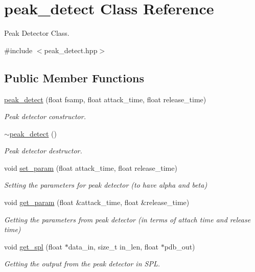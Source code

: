 \hypertarget{classpeak__detect}{}\section{peak\+\_\+detect Class Reference}
\label{classpeak__detect}


Peak Detector Class.  




{\ttfamily \#include $<$peak\+\_\+detect.\+hpp$>$}

\subsection*{Public Member Functions}
\begin{DoxyCompactItemize}
\item 
\hyperlink{classpeak__detect_a03414e20d9aa0ffce0196ac21ec61ec6}{peak\+\_\+detect} (float fsamp, float attack\+\_\+time, float release\+\_\+time)
\begin{DoxyCompactList}\small\item\em Peak detector constructor. \end{DoxyCompactList}\item 
\mbox{\label{classpeak__detect_a510f52abf08178bfa1f81ee8b28857fe}} 
\hyperlink{classpeak__detect_a510f52abf08178bfa1f81ee8b28857fe}{$\sim$peak\+\_\+detect} ()
\begin{DoxyCompactList}\small\item\em Peak detector destructor. \end{DoxyCompactList}\item 
void \hyperlink{classpeak__detect_aec3991cf46c3855861255ef03325e172}{set\+\_\+param} (float attack\+\_\+time, float release\+\_\+time)
\begin{DoxyCompactList}\small\item\em Setting the parameters for peak detector (to have alpha and beta) \end{DoxyCompactList}\item 
void \hyperlink{classpeak__detect_a58886dc32aeeab39e3912f3096856f42}{get\+\_\+param} (float \&attack\+\_\+time, float \&release\+\_\+time)
\begin{DoxyCompactList}\small\item\em Getting the parameters from peak detector (in terms of attach time and release time) \end{DoxyCompactList}\item 
void \hyperlink{classpeak__detect_a3b3332bd0bbc4c383887732cc8a19558}{get\+\_\+spl} (float $\ast$data\+\_\+in, size\+\_\+t in\+\_\+len, float $\ast$pdb\+\_\+out)
\begin{DoxyCompactList}\small\item\em Getting the output from the peak detector in S\+PL. \end{DoxyCompactList}\end{DoxyCompactItemize}


